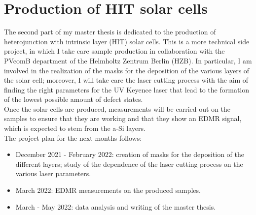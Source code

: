 \documentclass[a4paper]{book}
\begin{document}
	\section{Production of HIT solar cells}
	The second part of my master thesis is dedicated to the production of heterojunction with intrinsic layer (HIT) solar cells. This is a more technical side project, in which I  take care sample production in collaboration with the PVcomB department of the Helmholtz Zentrum Berlin (HZB). In particular, I am involved in the realization of the masks for the deposition of the various layers of the solar cell; moreover, I will take care the laser cutting process with the aim of finding the right parameters for the UV Keyence laser that lead to the formation of the lowest possible amount of defect states.\\
	Once the solar cells are produced, measurements will be carried out on the samples to ensure that they are working and that they show an EDMR signal, which is expected to stem from the a-Si layers.\\
	The project plan for the next months follows:
	\begin{itemize}
		\item December 2021 - February 2022: creation of masks for the deposition of the different layers; study of the dependence of the laser cutting process on the various laser parameters. 
		\item March 2022: EDMR measurements on the produced samples.
		\item March - May 2022: data analysis and writing of the master thesis.		
	\end{itemize}
	
	\printbibliography
\end{document}
